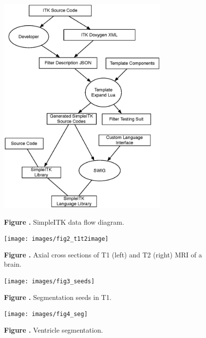 \documentclass{frontiersMED} %
\begin{document}
\begin{figure}
\begin{center}
\includegraphics[width=8.5cm]{images/fig1_dataflow}
\end{center}
 \textbf{\label{fig:01} Figure .}{ SimpleITK data flow diagram. }
\end{figure}

\begin{figure}
\begin{center}
\texttt{[image: images/fig2\_t1t2image]}
\end{center}
 \textbf{\label{fig:02} Figure .}{ Axial cross sections of T1 (left) and T2 (right) MRI of a brain. }
\end{figure}

\begin{figure}
\begin{center}
\texttt{[image: images/fig3\_seeds]}
\end{center}
 \textbf{\label{fig:03} Figure .}{ Segmentation seeds in T1. }
\end{figure}

\begin{figure}
\begin{center}
\texttt{[image: images/fig4\_seg]}
\end{center}
 \textbf{\label{fig:04} Figure .}{ Ventricle segmentation. }
\end{figure}
\end{document}
